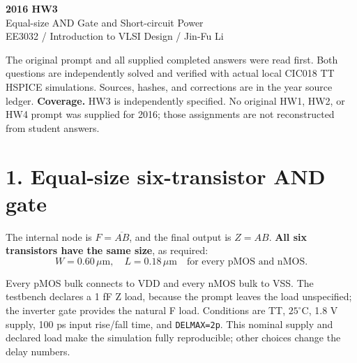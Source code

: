 \documentclass[11pt,a4paper]{article}
\newcommand{\VDD}{V_{\mathrm{DD}}}
\newcommand{\VSS}{V_{\mathrm{SS}}}
\newcommand{\MOS}[5]{
  \coordinate (#1) at (#2,#3);
  \coordinate (#1t) at ($(#1)+(0,.55)$);
  \coordinate (#1b) at ($(#1)+(0,-.55)$);
  \draw (#1t)--($(#1)+(0,.30)$)--($(#1)+(-.18,.30)$);
  \draw ($(#1)+(-.18,.34)$)--($(#1)+(-.18,-.34)$);
  \draw ($(#1)+(-.18,-.30)$)--($(#1)+(0,-.30)$)--(#1b);
  \draw ($(#1)+(-.35,.33)$)--($(#1)+(-.35,-.33)$);
  \def\type{#5}\def\ptype{p}
  \ifx\type\ptype
    \draw ($(#1)+(-.78,0)$)--($(#1)+(-.53,0)$);
    \draw ($(#1)+(-.465,0)$) circle (.065);
    \draw ($(#1)+(-.40,0)$)--($(#1)+(-.35,0)$);
  \else
    \draw ($(#1)+(-.78,0)$)--($(#1)+(-.35,0)$);
  \fi
  \node[anchor=east] at ($(#1)+(-.82,0)$) {$#4$};
  \node[anchor=west,font=\scriptsize] at ($(#1)+(.10,0)$) {#1};
}
\begin{document}
\begin{center}{\LARGE\bfseries 2016 HW3}\\[4pt]{\large Equal-size AND Gate and Short-circuit Power}\\[4pt]{\small EE3032 / Introduction to VLSI Design / Jin-Fu Li}\end{center}
The original prompt and all supplied completed answers were read first. Both questions are independently solved and verified with actual local CIC018 TT HSPICE simulations. Sources, hashes, and corrections are in the year source ledger.
\textbf{Coverage.} HW3 is independently specified. No original HW1, HW2, or HW4 prompt was supplied for 2016; those assignments are not reconstructed from student answers.

\section*{1. Equal-size six-transistor AND gate}
The internal node is $F=\overline{AB}$, and the final output is $Z=AB$. \textbf{All six transistors have the same size}, as required:
\[
 \boxed{W=0.60\,\mu\mathrm m,\quad L=0.18\,\mu\mathrm m\quad\text{for every pMOS and nMOS}.}
\]
\begin{center}\end{center}
Every pMOS bulk connects to VDD and every nMOS bulk to VSS. The testbench declares a 1 fF Z load, because the prompt leaves the load unspecified; the inverter gate provides the natural F load. Conditions are TT, $25^\circ$C, 1.8 V supply, 100 ps input rise/fall time, and \texttt{DELMAX=2p}. This nominal supply and declared load make the simulation fully reproducible; other choices change the delay numbers.
\end{document}
